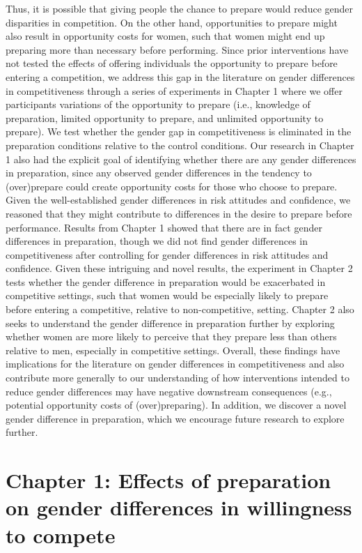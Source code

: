 \documentclass[a4paper, nobind]{templates/ociamthesis}
\begin{document}
Thus, it is possible that giving people the chance to prepare would reduce gender disparities in competition. On the other hand, opportunities to prepare might also result in opportunity costs for women, such that women might end up preparing more than necessary before performing. Since prior interventions have not tested the effects of offering individuals the opportunity to prepare before entering a competition, we address this gap in the literature on gender differences in competitiveness through a series of experiments in Chapter 1 where we offer participants variations of the opportunity to prepare (i.e., knowledge of preparation, limited opportunity to prepare, and unlimited opportunity to prepare). We test whether the gender gap in competitiveness is eliminated in the preparation conditions relative to the control conditions. Our research in Chapter 1 also had the explicit goal of identifying whether there are any gender differences in preparation, since any observed gender differences in the tendency to (over)prepare could create opportunity costs for those who choose to prepare. Given the well-established gender differences in risk attitudes and confidence, we reasoned that they might contribute to differences in the desire to prepare before performance. Results from Chapter 1 showed that there are in fact gender differences in preparation, though we did not find gender differences in competitiveness after controlling for gender differences in risk attitudes and confidence. Given these intriguing and novel results, the experiment in Chapter 2 tests whether the gender difference in preparation would be exacerbated in competitive settings, such that women would be especially likely to prepare before entering a competitive, relative to non-competitive, setting. Chapter 2 also seeks to understand the gender difference in preparation further by exploring whether women are more likely to perceive that they prepare less than others relative to men, especially in competitive settings. Overall, these findings have implications for the literature on gender differences in competitiveness and also contribute more generally to our understanding of how interventions intended to reduce gender differences may have negative downstream consequences (e.g., potential opportunity costs of (over)preparing). In addition, we discover a novel gender difference in preparation, which we encourage future research to explore further.

\hypertarget{chapter-1-effects-of-preparation-on-gender-differences-in-willingness-to-compete}{%
\chapter{Chapter 1: Effects of preparation on gender differences in willingness to compete}\label{chapter-1-effects-of-preparation-on-gender-differences-in-willingness-to-compete}}
\end{document}
